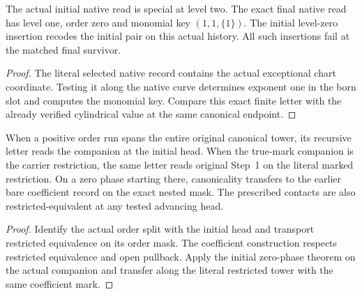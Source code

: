 \begin{theorem}
\label{hir:g1-advanced-head-exact-native-payload}
\leanok
The actual initial native read is special at level two.
The exact final native read has level one, order zero
and monomial key \((1,1,\{1\})\). The initial level-zero
insertion recodes the initial pair on this actual
history. All such insertions fail at the matched final
survivor.
\end{theorem}
\begin{proof}
The literal selected native record contains the actual
exceptional chart coordinate. Testing it along the native
curve determines exponent one in the born slot and
computes the monomial key. Compare this exact finite
letter with the already verified cylindrical value
at the same canonical endpoint.
\end{proof}

\begin{theorem}
\label{hir:g1-same-mark-initial-stepOne-read}
\leanok
When a positive order run spans the entire original canonical
tower, its recursive letter reads the companion at the initial
head. When the true-mark companion is the carrier restriction,
the same letter reads original Step~1 on the literal marked
restriction. On a zero phase starting there, canonicality
transfers to the earlier bare coefficient record on the exact
nested mask. The prescribed contacts are also
restricted-equivalent at any tested advancing head.
\end{theorem}
\begin{proof}
Identify the actual order split with the initial head and
transport restricted equivalence on its order mask. The
coefficient construction respects restricted equivalence
and open pullback. Apply the initial zero-phase theorem
on the actual companion and transfer along the literal
restricted tower with the same coefficient mark.
\end{proof}

